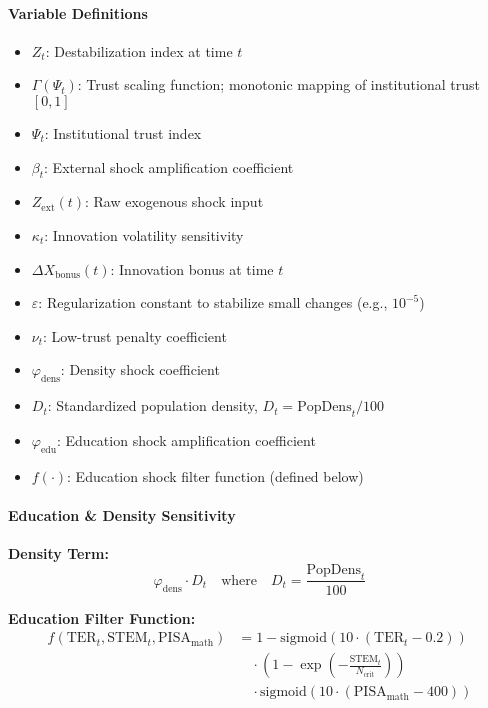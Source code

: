 \documentclass[12pt]{report}
\begin{document}
\paragraph{Variable Definitions}
\begin{itemize}
  \item $Z_t$: Destabilization index at time $t$
  \item $\Gamma(\Psi_t)$: Trust scaling function; monotonic mapping of institutional trust $[0,1]$
  \item $\Psi_t$: Institutional trust index
  \item $\beta_t$: External shock amplification coefficient
  \item $Z_{\text{ext}}(t)$: Raw exogenous shock input
  \item $\kappa_t$: Innovation volatility sensitivity
  \item $\Delta X_{\text{bonus}}(t)$: Innovation bonus at time $t$
  \item $\varepsilon$: Regularization constant to stabilize small changes (e.g., $10^{-5}$)
  \item $\nu_t$: Low-trust penalty coefficient
  \item $\varphi_{\text{dens}}$: Density shock coefficient
  \item $D_t$: Standardized population density, $D_t = \text{PopDens}_t / 100$
  \item $\varphi_{\text{edu}}$: Education shock amplification coefficient
  \item $f(\cdot)$: Education shock filter function (defined below)
\end{itemize}

\paragraph{Education \& Density Sensitivity}

\textbf{Density Term:}
\[
\varphi_{\text{dens}} \cdot D_t \quad \text{where} \quad D_t = \frac{\text{PopDens}_t}{100}
\]

\textbf{Education Filter Function:}
\begin{equation}
\begin{aligned}
f(\text{TER}_t, \text{STEM}_t, \text{PISA}_{\text{math}}) 
&= 1 - \text{sigmoid}(10 \cdot (\text{TER}_t - 0.2)) \\
&\quad \cdot \left(1 - \exp\left(-\frac{\text{STEM}_t}{N_{\text{crit}}} \right)\right) \\
&\quad \cdot \text{sigmoid}(10 \cdot (\text{PISA}_{\text{math}} - 400))
\end{aligned}
\label{eq:EducationFilter}
\end{equation}
\end{document}
